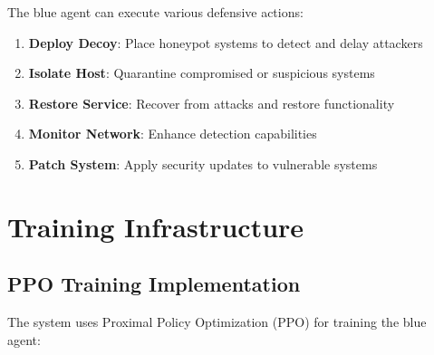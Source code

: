 \documentclass[12pt,a4paper]{article}
\begin{document}
The blue agent can execute various defensive actions:

\begin{enumerate}
    \item \textbf{Deploy Decoy}: Place honeypot systems to detect and delay attackers
    \item \textbf{Isolate Host}: Quarantine compromised or suspicious systems
    \item \textbf{Restore Service}: Recover from attacks and restore functionality
    \item \textbf{Monitor Network}: Enhance detection capabilities
    \item \textbf{Patch System}: Apply security updates to vulnerable systems
\end{enumerate}

\section{Training Infrastructure}

\subsection{PPO Training Implementation}

The system uses Proximal Policy Optimization (PPO) for training the blue agent:
\end{document}
